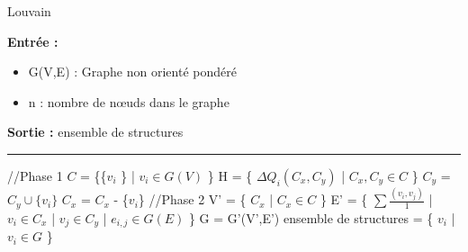 \documentclass[a4paper,oneside,12pt]{report}
\theoremstyle{definition}
\begin{document}
\begin{algorithm}[H]
					\label{alg:Lovain}
					\caption{Louvain}
					\textbf{Entrée :}
						\begin{itemize}[label=$\bullet$]
							\item G(V,E) : Graphe non orienté pondéré
							\item n : nombre de nœuds dans le graphe 
							
						\end{itemize}
					\textbf{Sortie :} ensemble de structures\\							\noindent\rule{\textwidth}{1pt}
						
						
				\begin{algorithmic} [1]
				 \STATE //Phase 1
				 \STATE $C$ = \{\{$v_i$ \} | $v_i \in G(V)$ \}
				 \REPEAT
					\STATE H = \{ $\Delta Q_i(C_x,C_y)$ | $C_x,C_y \in C$ \}
					\STATE $C_y$ = $C_y \cup \{v_i\}$
					\STATE $C_x$ = $C_x$ - \{$v_i$\}
					 \ENDIF
					  \ENDFOR
					  \STATE //Phase 2
					 \STATE V' = \{ $C_x$ | $C_x \in C$ \}
					  \STATE E' = \{ $\sum \frac{(v_i,v_j)}{1}$ | $v_i \in C_x$ | $v_j \in C_y$ | $e_{i,j} \in G(E)$ \}
					 \STATE G = G'(V',E')
				\STATE ensemble de structures = \{ $v_i$ | $v_i \in G$ \} 	   
				\end{algorithmic}
			\end{algorithm}





\end{document}
